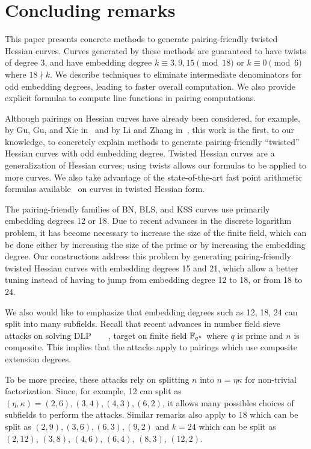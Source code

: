 \section{Concluding remarks}
\label{sec:conclude}

This paper presents concrete methods to generate pairing-friendly twisted Hessian curves.
Curves generated by these methods are guaranteed to have twists of degree $3$, and
have embedding degree
$k \equiv 3,9,15 \pmod{18}$ or
$k \equiv 0 \pmod{6}$ where $18 \nmid k$.
We describe techniques to eliminate intermediate denominators for odd embedding degrees, leading to faster overall computation.
We also provide explicit formulas to compute line functions in pairing computations.

Although pairings on Hessian curves have already been considered,
for example, by Gu, Gu, and Xie in~\cite{2010/Gu} and by Li and Zhang in~\cite{2012/Li},
this work is the first, to our knowledge, to concretely explain methods to generate
pairing-friendly ``twisted'' Hessian curves with odd embedding degree.
Twisted Hessian curves are a generalization of Hessian curves; using twists allows our formulas to be applied to more curves.
We also take advantage of the state-of-the-art fast point arithmetic formulas available~\cite{2015/hessian}
on curves in twisted Hessian form.

The pairing-friendly families of BN, BLS, and KSS curves use primarily embedding degrees 12 or 18.
Due to recent advances in the discrete logarithm problem, it has become necessary to increase the size of the finite field,
which can be done either by increasing the size of the prime or by increasing the embedding degree.
Our constructions address this problem by generating pairing-friendly twisted Hessian curves with embedding degrees 15 and 21,
which allow a better tuning instead of having to jump from embedding degree 12 to 18, or from 18 to 24.

We also would like to emphasize that embedding degrees such as 12, 18, 24 can split into many subfields.
Recall that recent advances in number field sieve attacks on solving DLP~\cite{2016/conjugate}~\cite{2016/SS}~\cite{2016/KB}~\cite{2017/KJ},
target on finite field $\mathbb{F}_{q^n}$ where $q$ is prime and $n$ is composite.
This implies that the attacks apply to pairings which use composite extension degrees.

To be more precise, these attacks rely on splitting $n$ into $n = \eta \kappa$ for non-trivial factorization.
Since, for example, 12 can split as $(\eta,\kappa) = (2,6), (3,4), (4,3), (6,2)$,
it allows many possibles choices of subfields to perform the attacks.
Similar remarks also apply to
$18$ which can be split as $(2,9), (3,6), (6,3), (9,2)$
and
$k = 24$ which can be split as $(2,12)$, $(3,8)$, $(4,6)$, $(6,4)$, $(8,3)$, $(12,2)$.

